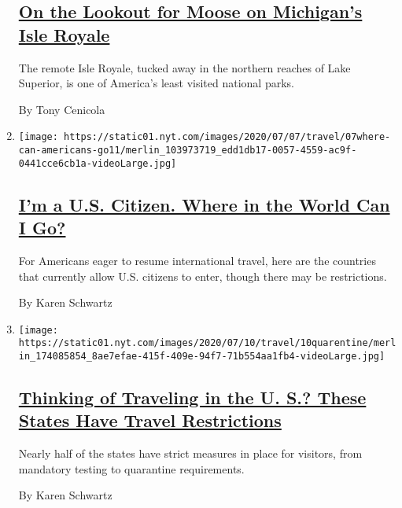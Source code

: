 \begin{enumerate}
{  \subsection{\texorpdfstring{\href{/2020/07/27/travel/moose-michigan-isle-royale.html}{On
  the Lookout for Moose on Michigan's Isle
  Royale}}{On the Lookout for Moose on Michigan's Isle Royale}}\label{on-the-lookout-for-moose-on-michigans-isle-royale}}

  The remote Isle Royale, tucked away in the northern reaches of Lake
  Superior, is one of America's least visited national parks.

  By Tony Cenicola
\item
  \texttt{[image: https://static01.nyt.com/images/2020/07/07/travel/07where-can-americans-go11/merlin\_103973719\_edd1db17-0057-4559-ac9f-0441cce6cb1a-videoLarge.jpg]}

  \hypertarget{im-a-us-citizen-where-in-the-world-can-i-go}{%
  \subsection{\texorpdfstring{\href{/2020/07/07/travel/american-travelers-restrictions-coronavirus.html}{I'm
  a U.S. Citizen. Where in the World Can I
  Go?}}{I'm a U.S. Citizen. Where in the World Can I Go?}}\label{im-a-us-citizen-where-in-the-world-can-i-go}}

  For Americans eager to resume international travel, here are the
  countries that currently allow U.S. citizens to enter, though there
  may be restrictions.

  By Karen Schwartz
\item
  \texttt{[image: https://static01.nyt.com/images/2020/07/10/travel/10quarentine/merlin\_174085854\_8ae7efae-415f-409e-94f7-71b554aa1fb4-videoLarge.jpg]}

  \hypertarget{thinking-of-traveling-in-the-u-s-these-states-have-travel-restrictions}{%
  \subsection{\texorpdfstring{\href{/2020/07/10/travel/state-travel-restrictions.html}{Thinking
  of Traveling in the U. S.? These States Have Travel
  Restrictions}}{Thinking of Traveling in the U. S.? These States Have Travel Restrictions}}\label{thinking-of-traveling-in-the-u-s-these-states-have-travel-restrictions}}

  Nearly half of the states have strict measures in place for visitors,
  from mandatory testing to quarantine requirements.

  By Karen Schwartz
\end{enumerate}

